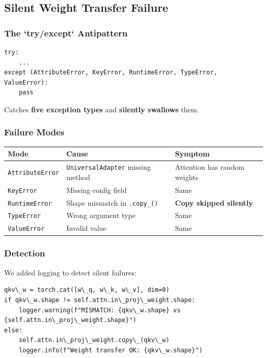 \subsection{Silent Weight Transfer Failure}

\subsubsection{The `try/except` Antipattern}

\begin{lstlisting}
try:
    ...
except (AttributeError, KeyError, RuntimeError, TypeError, ValueError):
    pass
\end{lstlisting}

Catches \textbf{five exception types} and \textbf{silently swallows} them.

\subsubsection{Failure Modes}

\begin{table}[H]
\centering
\small
\begin{tabular}{lll}
\toprule
\textbf{Mode} & \textbf{Cause} & \textbf{Symptom} \\
\midrule
\texttt{AttributeError} & \texttt{UniversalAdapter} missing method & Attention has random weights \\
\texttt{KeyError} & Missing config field & Same \\
\texttt{RuntimeError} & Shape mismatch in \texttt{.copy\_()} & \textbf{Copy skipped silently} \\
\texttt{TypeError} & Wrong argument type & Same \\
\texttt{ValueError} & Invalid value & Same \\
\bottomrule
\end{tabular}
\end{table}

\subsubsection{Detection}

We added logging to detect silent failures:

\begin{lstlisting}
qkv\_w = torch.cat([w\_q, w\_k, w\_v], dim=0)
if qkv\_w.shape != self.attn.in\_proj\_weight.shape:
    logger.warning(f"MISMATCH: {qkv\_w.shape} vs {self.attn.in\_proj\_weight.shape}")
else:
    self.attn.in\_proj\_weight.copy\_(qkv\_w)
    logger.info(f"Weight transfer OK: {qkv\_w.shape}")
\end{lstlisting}

